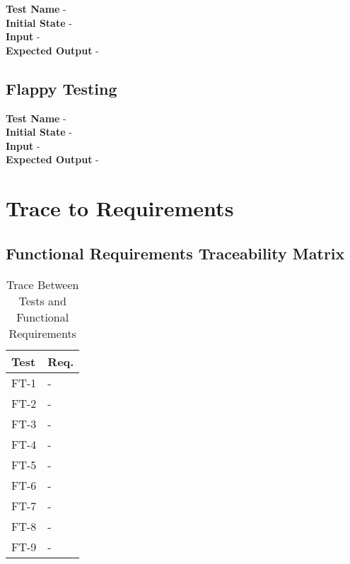 \documentclass[12pt, titlepage]{article}
\begin{document}
\textbf{Test Name} - \\
\textbf{Initial State} - \\
\textbf{Input} - \\
\textbf{Expected Output} - \\

\subsection{Flappy Testing}

\textbf{Test Name} - \\
\textbf{Initial State} - \\
\textbf{Input} - \\
\textbf{Expected Output} - \\

\section{Trace to Requirements}	

\subsection{Functional Requirements Traceability Matrix}
\begin{table}[H]
\centering
\begin{tabular}{p{} p{}}
\toprule
\textbf{Test} & \textbf{Req.}\\
\midrule
FT-1 & -\\
FT-2 & -\\
FT-3 & -\\
FT-4 & -\\
FT-5 & -\\
FT-6 & -\\
FT-7 & -\\
FT-8 & -\\
FT-9 & -\\
\bottomrule
\end{tabular}
\caption{Trace Between Tests and Functional Requirements}
\label{TblTFR}
\end{table}

\newpage
\end{document}
